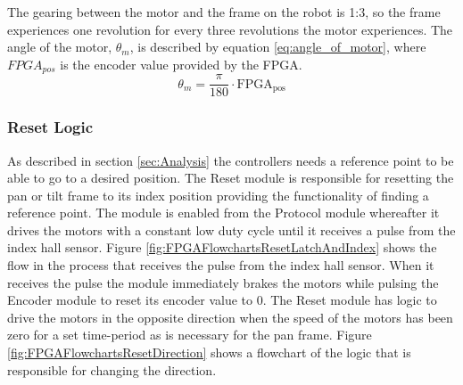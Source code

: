 \documentclass[../../main.tex]{subfiles}
\begin{document}


The gearing between the motor and the frame on the robot is 1:3, so the frame experiences one revolution for every three revolutions the motor experiences. The angle of the motor, $ \theta_{m} $, is described by equation \ref{eq:angle_of_motor}, where $FPGA_{pos}$ is the encoder value provided by the FPGA.
\begin{equation}\label{eq:angle_of_motor}
     \theta_{m} = \frac{\pi}{180} \cdot \mathrm{FPGA_{pos}}
\end{equation}




\subsubsection*{Reset Logic}
As described in section \ref{sec:Analysis} the controllers needs a reference point to be able to go to a desired position. The Reset module is responsible for resetting the pan or tilt frame to its index position providing the functionality of finding a reference point. The module is enabled from the Protocol module whereafter it drives the motors with a constant low duty cycle until it receives a pulse from the index hall sensor. Figure \ref{fig:FPGAFlowchartsResetLatchAndIndex} shows the flow in the process that receives the pulse from the index hall sensor. When it receives the pulse the module immediately brakes the motors while pulsing the Encoder module to reset its encoder value to 0. The Reset module has logic to drive the motors in the opposite direction when the speed of the motors has been zero for a set time-period as is necessary for the pan frame. Figure \ref{fig:FPGAFlowchartsResetDirection} shows a flowchart of the logic that is responsible for changing the direction. 





%
\end{document}
